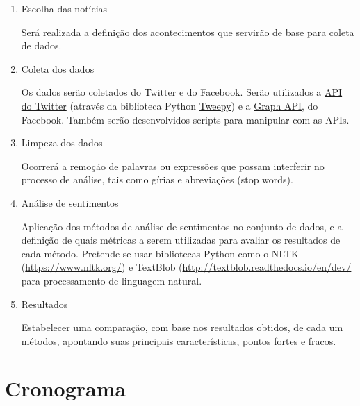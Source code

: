 \documentclass[12pt,article,a4paper,brazil,oldfontcommands,oneside]{abntex2}
\begin{document}
\begin{enumerate}
    \item Escolha das notícias
    
Será realizada a definição dos acontecimentos que servirão de base para coleta de dados.

    \item Coleta dos dados

Os dados serão coletados do Twitter e do Facebook. Serão utilizados a \href{https://developer.twitter.com/en/docs/api-reference-index}{API do Twitter} (através da biblioteca Python \href{http://www.tweepy.org/}{Tweepy}) e a \href{https://developers.facebook.com/docs/graph-api?locale=pt_BR}{Graph API}, do Facebook. Também serão desenvolvidos scripts para manipular com as APIs.
    
    \item Limpeza dos dados

Ocorrerá a remoção de palavras ou expressões que possam interferir no processo de análise, tais como gírias e abreviações (stop words).

    \item Análise de sentimentos

Aplicação dos métodos de análise de sentimentos no conjunto de dados, e a definição de quais métricas a serem utilizadas para avaliar os resultados de cada método. Pretende-se usar bibliotecas Python como o NLTK (\url{https://www.nltk.org/}) e TextBlob (\url{http://textblob.readthedocs.io/en/dev/} para processamento de linguagem natural.

    \item Resultados

Estabelecer uma comparação, com base nos resultados obtidos, de cada um métodos, apontando suas principais características, pontos fortes e fracos.

\end{enumerate}


\section{Cronograma}
\end{document}
